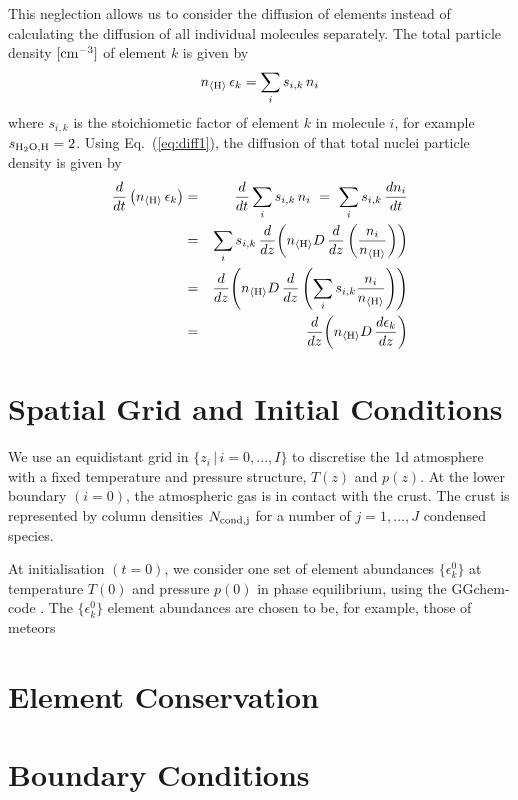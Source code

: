 \documentclass[11pt]{article}
\def\nH{n_{\langle\rm H\rangle}}
\def\ek{\epsilon_k}
\begin{document}
This neglection allows us to consider the diffusion of elements
instead of calculating the diffusion of all individual molecules separately.
The total particle density $\rm[cm^{-3}]$ of element $k$ is given by 
\begin{equation}
  \nH\,\ek = \sum_i s_{i,k}\,n_i
\end{equation} 
where $s_{i,k}$ is the stoichiometic factor of element $k$ in molecule
$i$, for example $s_{\rm H_2O,H}=2$. Using Eq.~(\ref{eq:diff1}), the
diffusion of that total nuclei particle density is given by
\begin{eqnarray}
  \frac{d}{dt}\left(\nH\,\ek\right)
  &=& \frac{d}{dt}\sum_i s_{i,k}\,n_i
  ~=~ \sum_i s_{i,k}\,\frac{dn_i}{dt} \\
  &=& \sum_i s_{i,k}\,\frac{d}{dz}\!\left(\nH D\,\frac{d}{dz}
                     \left(\frac{n_i}{\nH}\right)\right) \\
  &=& \frac{d}{dz}\!\left(\nH D\,\frac{d}{dz}\left(\sum_i s_{i,k}
  \frac{n_i}{\nH}\right)\right) \\
  &=& \frac{d}{dz}\!\left(\nH D\,\frac{d\ek}{dz}\right)
\end{eqnarray}




\section{Spatial Grid and Initial Conditions}

We use an equidistant grid in $\{z_i\,|\,i\!=\!0,...,I\}$ to
discretise the 1d atmosphere with a fixed temperature and pressure
structure, $T(z)$ and $p(z)$. At the lower boundary $(i=0)$, the
atmospheric gas is in contact with the crust. The crust is represented
by column densities $N_{\rm cond,j}$ for a number of $j=1,...,J$
condensed species.

At initialisation $(t=0)$, we consider one set of element abundances
$\{\epsilon_k^0\}$ at temperature $T(0)$ and pressure $p(0)$ in phase
equilibrium, using the {\sc GGchem}-code \citep{Woitke2017}.  
The $\{\epsilon_k^0\}$ element abundances are chosen to be, 
for example, those of meteors 


\section{Element Conservation}



\section{Boundary Conditions}
\end{document}
